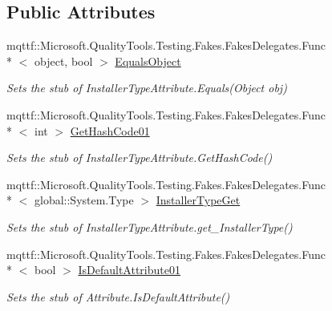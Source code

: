 \subsection*{Public Attributes}
\begin{DoxyCompactItemize}
\item 
mqttf\-::\-Microsoft.\-Quality\-Tools.\-Testing.\-Fakes.\-Fakes\-Delegates.\-Func\\*
$<$ object, bool $>$ \hyperlink{class_system_1_1_component_model_1_1_fakes_1_1_stub_installer_type_attribute_a9e6140629d7f819dd342a6279b0f27a2}{Equals\-Object}
\begin{DoxyCompactList}\small\item\em Sets the stub of Installer\-Type\-Attribute.\-Equals(\-Object obj)\end{DoxyCompactList}\item 
mqttf\-::\-Microsoft.\-Quality\-Tools.\-Testing.\-Fakes.\-Fakes\-Delegates.\-Func\\*
$<$ int $>$ \hyperlink{class_system_1_1_component_model_1_1_fakes_1_1_stub_installer_type_attribute_a1e172427d37c3f283e7bfc2628662f7c}{Get\-Hash\-Code01}
\begin{DoxyCompactList}\small\item\em Sets the stub of Installer\-Type\-Attribute.\-Get\-Hash\-Code()\end{DoxyCompactList}\item 
mqttf\-::\-Microsoft.\-Quality\-Tools.\-Testing.\-Fakes.\-Fakes\-Delegates.\-Func\\*
$<$ global\-::\-System.\-Type $>$ \hyperlink{class_system_1_1_component_model_1_1_fakes_1_1_stub_installer_type_attribute_af4cac39fc2c2d82d09d9a116c6b4c92e}{Installer\-Type\-Get}
\begin{DoxyCompactList}\small\item\em Sets the stub of Installer\-Type\-Attribute.\-get\-\_\-\-Installer\-Type()\end{DoxyCompactList}\item 
mqttf\-::\-Microsoft.\-Quality\-Tools.\-Testing.\-Fakes.\-Fakes\-Delegates.\-Func\\*
$<$ bool $>$ \hyperlink{class_system_1_1_component_model_1_1_fakes_1_1_stub_installer_type_attribute_a80f0f055abcd82328f7a0fcb863b61c7}{Is\-Default\-Attribute01}
\begin{DoxyCompactList}\small\item\em Sets the stub of Attribute.\-Is\-Default\-Attribute()\end{DoxyCompactList}\item 

\end{DoxyCompactItemize}
